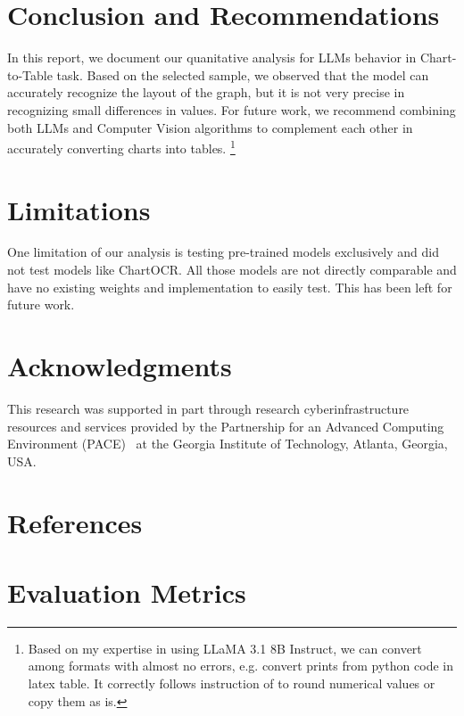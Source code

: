 \documentclass[
	letterpaper, %
]{jdf}
\begin{document}
\section{Conclusion and Recommendations}\label{sect:conclusion}
In this report, we document our quanitative analysis for LLMs behavior in Chart-to-Table task.
Based on the selected sample, we observed that the model can accurately recognize the layout of the graph, but it is not very precise in recognizing small differences in values.
For future work, we recommend combining both LLMs and Computer Vision algorithms to complement each other in accurately converting charts into tables.
\footnote{Based on my expertise in using LLaMA 3.1 8B Instruct, we can convert among formats with almost no errors, e.g. convert prints from python code in latex table. It correctly follows instruction of to round numerical values or copy them as is.}

\section{Limitations}\label{sect:limitations}
One limitation of our analysis is testing pre-trained models exclusively and did not test models like ChartOCR.
All those models are not directly comparable and have no existing weights and implementation to easily test.
This has been left for future work.

\section{Acknowledgments}
This research was supported in part through research cyberinfrastructure resources and services provided by the Partnership for an Advanced Computing Environment (PACE)~\cite{pace2017partnership} at the Georgia Institute of Technology, Atlanta, Georgia, USA.

\section{References}
\printbibliography[heading=none]

\appendix
\section{Evaluation Metrics}\label{app:metrics}
\end{document}
